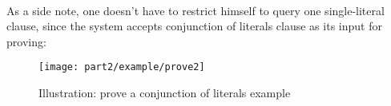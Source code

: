 \documentclass[../gr-final.tex]{subfiles}
\begin{document}
\paragraph{} As a side note, one doesn't have to restrict himself
to query one single-literal clause, since the system accepts
conjunction of literals clause as its input for proving:
\begin{figure}[H]
  \centering
  \texttt{[image: part2/example/prove2]}
  \caption{Illustration: prove a conjunction of literals example}
\end{figure}
\end{document}
